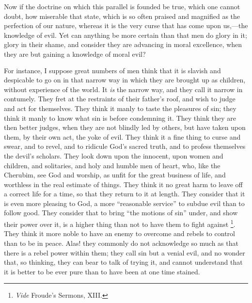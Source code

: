 Now if the doctrine on which this parallel is founded be true,
which one cannot doubt, how miserable that state, which is so often
praised and magnified as the perfection of our nature, whereas it is
the very curse that has come upon us,—the knowledge of evil. Yet can
anything be more certain than that men do glory in it; glory in their
shame, and consider they are advancing in moral excellence, when they
are but gaining a knowledge of moral evil?

For instance, I suppose great numbers of men think that it is
slavish and despicable to go on in that narrow way in which they are
brought up as children, without experience of the world. It \emph{is}
the narrow way, and they call it narrow in contumely. They fret at the
restraints of their father's roof, and wish to judge and act for
themselves. They think it manly to taste the pleasures of sin; they
think it manly to know what sin is before condemning it. They think
they are then better judges, when they are not blindly led by others,
but have taken upon them, by their own act, the yoke of evil. They
think it a fine thing to curse and swear, and to revel, and to
ridicule God's sacred truth, and to profess themselves the devil's
scholars. They look down upon the innocent, upon women and children,
and solitaries, and holy and humble men of heart, who, like the
Cherubim, see God and worship, as unfit for the great business of
life, and worthless in the real estimate of things. They think it no
great harm to leave off a correct life for a time, so that they return
to it at length. They consider that it is even more pleasing to God, a
more ``reasonable service'' to subdue evil than to follow
good. They consider that to bring ``the motions of sin''
under, and show their power over it, is a higher thing than not to
have them to fight against \footnote{\emph{Vide} Froude's Sermons, XIII.}.
They think it more noble to have an enemy to overcome and rebels to
control than to be in peace. Alas! they commonly do not acknowledge so
much as that there is a rebel power within them; they call sin but a
venial evil, and no wonder that, so thinking, they can bear to talk of
trying it, and cannot understand that it is better to be ever pure
than to have been at one time stained.

